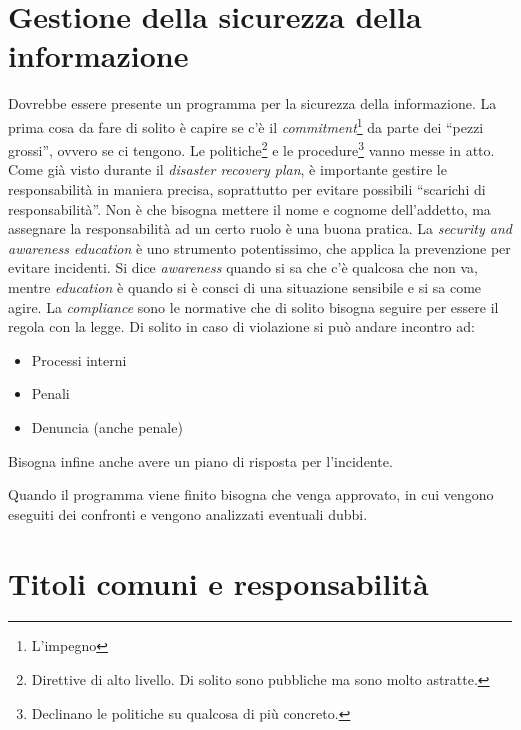 \section{Gestione della sicurezza della informazione}

Dovrebbe essere presente un programma per la sicurezza della informazione. La 
prima cosa da fare di solito è capire se c'è il 
\textit{commitment}\footnote{L'impegno} da parte dei ``pezzi grossi'', ovvero 
se ci tengono. Le politiche\footnote{Direttive di alto livello. Di solito sono 
pubbliche ma sono molto astratte.} e le procedure\footnote{Declinano le 
politiche su qualcosa di più concreto.} vanno messe in atto. Come già visto 
durante il \textit{disaster recovery plan}, è importante gestire le 
responsabilità in maniera precisa, soprattutto per evitare possibili ``scarichi 
di responsabilità''. Non è che bisogna mettere il nome e cognome dell'addetto, 
ma assegnare la responsabilità ad un certo ruolo è una buona pratica. La 
\textit{security and awareness education} è uno strumento potentissimo, che 
applica la prevenzione per evitare incidenti. Si dice \textit{awareness} quando 
si sa che c'è qualcosa che non va, mentre \textit{education} è quando si è 
consci di una situazione sensibile e si sa come agire.
La \textit{compliance} sono le normative che di solito bisogna seguire per 
essere il regola con la legge. Di solito in caso di violazione si può andare 
incontro ad:
\begin{itemize}
  \item Processi interni
  \item Penali
  \item Denuncia (anche penale)
\end{itemize}
Bisogna infine anche avere un piano di risposta per l'incidente.

Quando il programma viene finito bisogna che venga approvato, in cui vengono 
eseguiti dei confronti e vengono analizzati eventuali dubbi.

\section{Titoli comuni e responsabilità}


